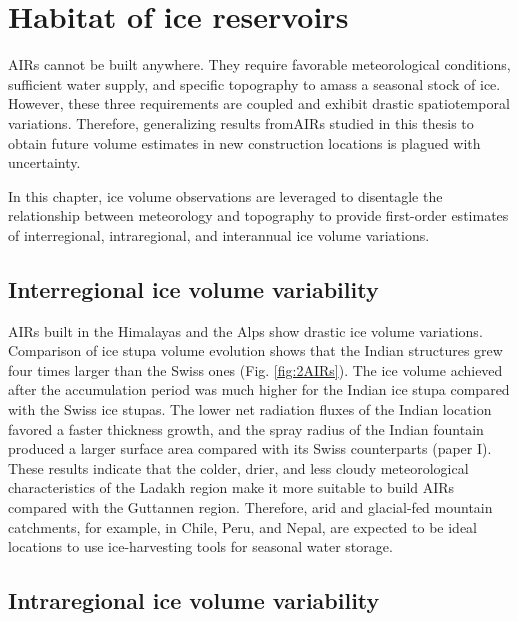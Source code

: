 \chapter{Habitat of ice reservoirs}


\ac{AIRs} cannot be built anywhere. They require favorable meteorological conditions, sufficient water supply,
and specific topography to amass a seasonal stock of ice. However, these three requirements are coupled and
exhibit drastic spatiotemporal variations. Therefore, generalizing results from\ac{AIRs} studied in this thesis to
obtain future volume estimates in new construction locations is plagued with uncertainty.

In this chapter, ice volume observations are leveraged to disentagle the relationship between meteorology
and topography to provide first-order estimates of interregional, intraregional, and interannual ice volume
variations. 

\section{Interregional ice volume variability}

\ac{AIRs} built in the Himalayas and the Alps show drastic ice volume variations. Comparison of ice stupa volume
evolution shows that the Indian structures grew four times larger than the Swiss ones (Fig. \ref{fig:2AIRs}). The
ice volume achieved after the accumulation period was much higher for the Indian ice stupa compared with the Swiss
ice stupas. The lower net radiation fluxes of the Indian location favored a faster thickness growth, and the
spray radius of the Indian fountain produced a larger surface area compared with its Swiss counterparts (paper I).
These results indicate that the colder, drier, and less cloudy meteorological characteristics of the Ladakh
region make it more suitable to build \ac{AIRs} compared with the Guttannen region. Therefore, arid and
glacial-fed mountain catchments, for example, in Chile, Peru, and Nepal, are expected to be ideal locations to use
ice-harvesting tools for seasonal water storage.

\section{Intraregional ice volume variability}

